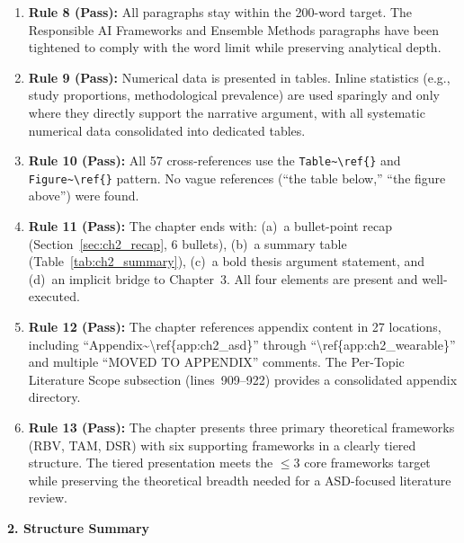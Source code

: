 \begin{enumerate}[nosep, leftmargin=*]
\item \textbf{Rule 8 (Pass):} All paragraphs stay within the 200-word target. The Responsible AI Frameworks and Ensemble Methods paragraphs have been tightened to comply with the word limit while preserving analytical depth.

\item \textbf{Rule 9 (Pass):} Numerical data is presented in tables. Inline statistics (e.g., study proportions, methodological prevalence) are used sparingly and only where they directly support the narrative argument, with all systematic numerical data consolidated into dedicated tables.

\item \textbf{Rule 10 (Pass):} All 57 cross-references use the \texttt{Table\textasciitilde\textbackslash ref\{\}} and \texttt{Figure\textasciitilde\textbackslash ref\{\}} pattern. No vague references (``the table below,'' ``the figure above'') were found.

\item \textbf{Rule 11 (Pass):} The chapter ends with: (a)~a bullet-point recap (Section~\ref{sec:ch2_recap}, 6 bullets), (b)~a summary table (Table~\ref{tab:ch2_summary}), (c)~a bold thesis argument statement, and (d)~an implicit bridge to Chapter~3. All four elements are present and well-executed.

\item \textbf{Rule 12 (Pass):} The chapter references appendix content in 27 locations, including ``Appendix\textasciitilde\textbackslash ref\{app:ch2\_asd\}'' through ``\textbackslash ref\{app:ch2\_wearable\}'' and multiple ``MOVED TO APPENDIX'' comments. The Per-Topic Literature Scope subsection (lines~909--922) provides a consolidated appendix directory.

\item \textbf{Rule 13 (Pass):} The chapter presents three primary theoretical frameworks (RBV, TAM, DSR) with six supporting frameworks in a clearly tiered structure. The tiered presentation meets the $\leq$3 core frameworks target while preserving the theoretical breadth needed for a ASD-focused literature review.
\end{enumerate}

\noindent\textbf{\color{ggunavy}2. Structure Summary}

